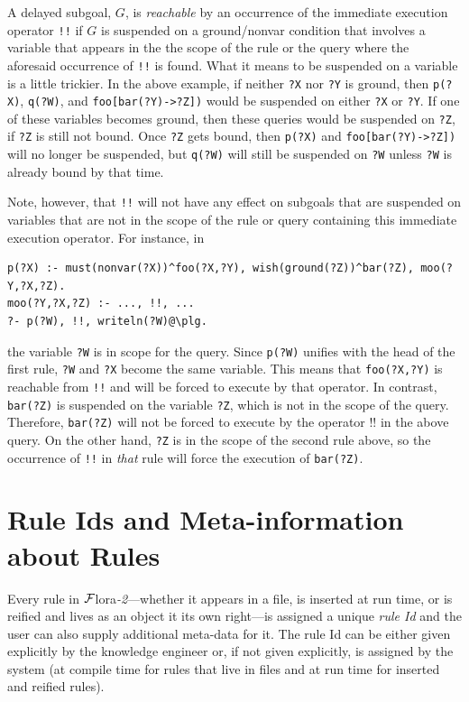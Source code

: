 \documentclass[11pt]{article}
\newcommand{\FLSYSTEM}{{\mbox{\sc ${\cal F}${lora}\rm\emph{-2}}}\xspace}
\begin{document}
A delayed subgoal, $G$, is \emph{reachable} by an occurrence of
the immediate execution
operator \texttt{!!} 
if $G$ is suspended on a ground/nonvar condition that
involves a variable that appears in the the scope of the rule or the query
where the aforesaid occurrence of \texttt{!!} is found. 
What it means to be suspended on a variable is a little trickier.
In the above example, if neither \texttt{?X} nor \texttt{?Y} is ground,
then \texttt{p(?X)}, \texttt{q(?W)}, and \texttt{foo[bar(?Y)->?Z])} would
be suspended on either \texttt{?X} or \texttt{?Y}. If one of these
variables becomes ground, then these queries would be suspended on
\texttt{?Z}, if \texttt{?Z} is still not bound.  Once \texttt{?Z}  gets bound,
then \texttt{p(?X)} and \texttt{foo[bar(?Y)->?Z])} will no longer be
suspended, but \texttt{q(?W)} will still be suspended on \texttt{?W} unless
\texttt{?W} is already bound by that time.   

Note, however, that \texttt{!!} will not have any effect on subgoals that
are suspended on variables that are not in the scope of the rule or query
containing this
immediate execution operator. For instance, in
\begin{verbatim}
p(?X) :- must(nonvar(?X))^foo(?X,?Y), wish(ground(?Z))^bar(?Z), moo(?Y,?X,?Z).
moo(?Y,?X,?Z) :- ..., !!, ...
?- p(?W), !!, writeln(?W)@\plg.
\end{verbatim}
the variable \texttt{?W} is in scope for the query. Since
\texttt{p(?W)} unifies with the head of the first rule, \texttt{?W} and
\texttt{?X} become the same variable. This means that \texttt{foo(?X,?Y)}
is reachable from \texttt{!!} and will be forced to execute by that operator.
In contrast, \texttt{bar(?Z)} is suspended on the variable \texttt{?Z},
which is not in the scope of the query. Therefore, \texttt{bar(?Z)} will
not be forced to execute by the operator !! in the above query.   
On the other hand, \texttt{?Z} is in the scope of the second rule above, so
the occurrence of \texttt{!!} in \emph{that} rule will force the execution of
\texttt{bar(?Z)}.   


\section{Rule Ids and Meta-information about Rules}
\label{sec-rule-id}

Every rule in \FLSYSTEM---whether it appears in a file, is inserted at run
time, or is reified and lives as an object it its own right---is assigned a
unique \emph{rule Id} and the user can also supply additional
meta-data for it. The rule Id can be either given explicitly by the
knowledge engineer or, if not given explicitly, is assigned by the system (at compile time for
rules that live in files and at run time for inserted and reified rules).
\end{document}

